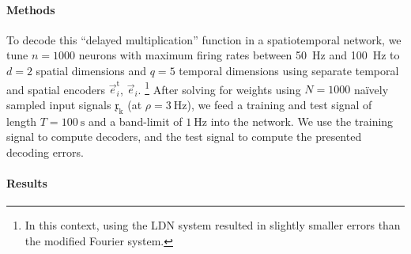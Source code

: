 \paragraph{Methods}
To decode this \enquote{delayed multiplication} function in a spatiotemporal network, we tune $n = 1000$ \LIF neurons with maximum firing rates between \SI{50}{\hertz} and \SI{100}{\hertz} to $d = 2$ spatial dimensions and $q = 5$ temporal \LDN dimensions using separate temporal and spatial encoders $\vec e_i^\mathrm{t}$, $\vec e_i$.%
\footnote{In this context, using the LDN system resulted in slightly smaller errors than the modified Fourier system.}
After solving for weights using $N = 1000$ na\"ively sampled input signals $\mathfrak{x}_\mathrm{k}$ (at $\rho = \SI{3}{\hertz}$), we feed a training and test signal of length $T = \SI{100}{\second}$ and a band-limit of $\SI{1}{\hertz}$ into the network.
We use the training signal to compute decoders, and the test signal to compute the presented decoding errors.

\paragraph{Results}


